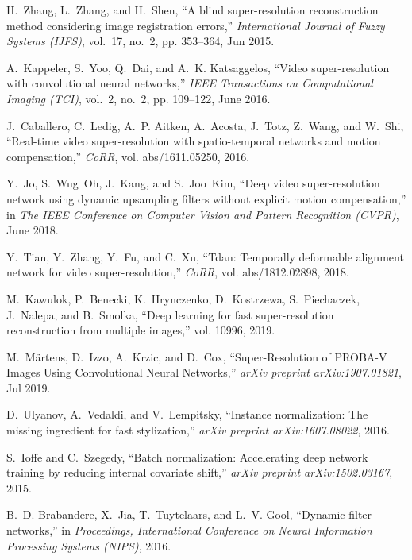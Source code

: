 \documentclass[journal]{IEEEtran}
\begin{document}
\begin{thebibliography}{10}
H.~Zhang, L.~Zhang, and H.~Shen, ``A blind super-resolution reconstruction
  method considering image registration errors,'' \emph{International Journal
  of Fuzzy Systems (IJFS)}, vol.~17, no.~2, pp. 353--364, Jun 2015.

A.~{Kappeler}, S.~{Yoo}, Q.~{Dai}, and A.~K. {Katsaggelos}, ``Video
  super-resolution with convolutional neural networks,'' \emph{IEEE
  Transactions on Computational Imaging (TCI)}, vol.~2, no.~2, pp. 109--122,
  June 2016.

J.~Caballero, C.~Ledig, A.~P. Aitken, A.~Acosta, J.~Totz, Z.~Wang, and W.~Shi,
  ``Real-time video super-resolution with spatio-temporal networks and motion
  compensation,'' \emph{CoRR}, vol. abs/1611.05250, 2016.

Y.~Jo, S.~Wug~Oh, J.~Kang, and S.~Joo~Kim, ``Deep video super-resolution
  network using dynamic upsampling filters without explicit motion
  compensation,'' in \emph{The IEEE Conference on Computer Vision and Pattern
  Recognition (CVPR)}, June 2018.

Y.~Tian, Y.~Zhang, Y.~Fu, and C.~Xu, ``Tdan: Temporally deformable alignment
  network for video super-resolution,'' \emph{CoRR}, vol. abs/1812.02898, 2018.

M.~Kawulok, P.~Benecki, K.~Hrynczenko, D.~Kostrzewa, S.~Piechaczek, J.~Nalepa,
  and B.~Smolka, ``Deep learning for fast super-resolution reconstruction from
  multiple images,'' vol. 10996, 2019.

M.~{M{\"a}rtens}, D.~{Izzo}, A.~{Krzic}, and D.~{Cox}, ``{Super-Resolution of
  PROBA-V Images Using Convolutional Neural Networks},'' \emph{arXiv preprint
  arXiv:1907.01821}, Jul 2019.

D.~Ulyanov, A.~Vedaldi, and V.~Lempitsky, ``Instance normalization: The missing
  ingredient for fast stylization,'' \emph{arXiv preprint arXiv:1607.08022},
  2016.

S.~Ioffe and C.~Szegedy, ``Batch normalization: Accelerating deep network
  training by reducing internal covariate shift,'' \emph{arXiv preprint
  arXiv:1502.03167}, 2015.

B.~D. Brabandere, X.~Jia, T.~Tuytelaars, and L.~V. Gool, ``Dynamic filter
  networks,'' in \emph{Proceedings, International Conference on Neural
  Information Processing Systems (NIPS)}, 2016.


\end{thebibliography}
\end{document}
